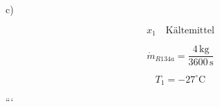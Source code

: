 c)

\[ x_1 \quad \text{Kältemittel} \]

\[ \dot{m}_{R134a} = \frac{4 \, \text{kg}}{3600 \, \text{s}} \]

\[ T_1 = -27^\circ \text{C} \]

```